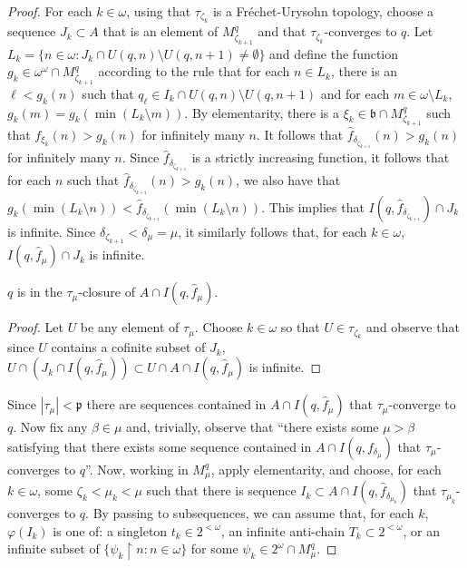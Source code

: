 \documentclass[10pt,a4paper]{amsart}
\begin{document}
\begin{proof}
For each $k\in\omega$, using that $\tau_{\zeta_k}$ is a
 Fr\'echet-Urysohn topology, choose a sequence $J_k\subset A$
 that is an element of $M^q_{\zeta_{k+1}}$ and that 
 $\tau_{\zeta_k}$-converges to $q$.    
Let  $L_k = \{ n\in  \omega : J_k\cap U(q,n)\setminus U(q,n+1)\neq\emptyset\}$
 and define the  function 
 $g_k\in\omega^\omega\cap M^q_{\zeta_{k+1}}$ 
 according to the rule that for each
  $n\in L_k$, 
  there is an $\ell< g_k(n)$ such
that $q_\ell \in I_k\cap U(q,n)\setminus U(q,n+1)$
and for each  $m\in\omega\setminus L_k$,
  $g_k(m) = g_k(\min(L_k\setminus m))$.  
By elementarity, there is a $\xi_k\in \mathfrak b
\cap M^q_{\zeta_{k+1}}$ such that $f_{\xi_k}(n)> g_k(n)$
for infinitely many $n$. It follows that $\hat f_{\delta_{\zeta_{k+1}}}(n)
> g_k(n)$ for infinitely many $n$. Since $\hat f_{\delta_{\zeta_{k+1}}}$ is
a strictly increasing function, it follows that for each $n$
such that $\hat f_{\delta_{\zeta_{k+1}}}(n)
> g_k(n)$, we also have that $g_k(\min(L_k\setminus n)) < 
\hat f_{\delta_{\zeta_{k+1}}}(\min(L_k\setminus n))$. 
This implies that 
$I(q,\hat f_{\delta_{\zeta_{k+1}}})\cap J_k$ is infinite.
Since $\delta_{\zeta_{k+1}}<\delta_\mu=\mu$,
 it similarly follows that, for each $k\in\omega$,
    $I(q,\hat f_{\mu}) \cap J_k$ is infinite.  

    \begin{claim}  $q$ is in the $\tau_\mu$-closure of
       $A\cap I(q,\hat f_{\mu})$. 
    \end{claim}

  \bgroup


\def\proofname{Proof of Claim.}

\begin{proof} Let $U$ be any element of $\tau_\mu$. 
  Choose $k\in\omega$ so that $U\in \tau_{\zeta_k}$
   and observe that  since $U$ contains a cofinite subset of $J_k$,
  $   U\cap (J_k\cap I(q,\hat f_{\mu}))\subset U\cap A\cap I(q,\hat f_\mu)$ is infinite.
\end{proof}


Since $|\tau_\mu|<\mathfrak p$ there are sequences contained
 in $A\cap I(q,\hat f_\mu)$ that $\tau_\mu$-converge to $q$. Now fix any $\beta\in \mu$
 and, trivially, observe that ``there exists some $\mu>\beta$ satisfying
 that there exists some sequence contained in $A\cap I(q,f_{\delta_\mu})$
 that  $\tau_{\mu}$-converges to $q$''. 
 Now, working in $M^q_\mu$, apply elementarity,
  and choose, for each $k\in\omega$, some $\zeta_k < \mu_k < \mu$ such
  that there is sequence $I_k\subset A\cap I(q,\hat f_{\delta_{\mu_k}})$ 
  that $\tau_{\mu_k}$-converges to $q$. By passing to subsequences,
   we can assume that, for each $k$, 
     $\varphi(I_k)$ is one of: a singleton $t_k\in 2^{<\omega}$,
      an infinite anti-chain $T_k\subset 2^{<\omega}$, or
      an infinite subset of $\{ \psi_k\restriction n : n\in\omega\}$
      for some $\psi_k\in 2^\omega\cap M^q_\mu$. 


\end{proof}
\end{document}
